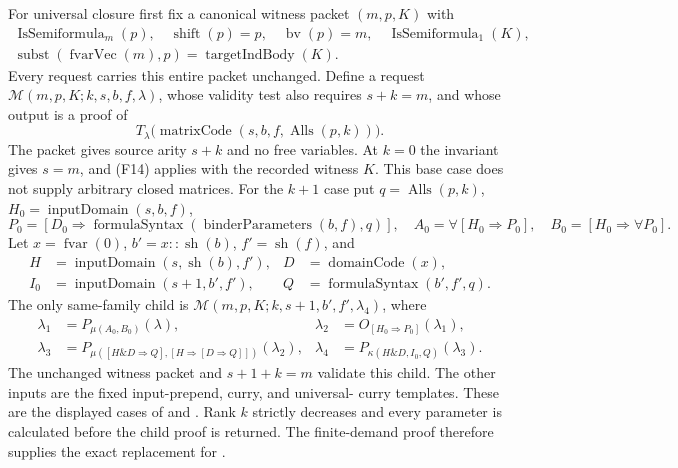 For universal closure first fix a canonical witness packet
$(m,p,K)$ with
\begin{gather*}
 \operatorname{IsSemiformula}_m(p),\quad
 \operatorname{shift}(p)=p,\quad \operatorname{bv}(p)=m,\quad
 \operatorname{IsSemiformula}_1(K),\\
 \operatorname{subst}(\operatorname{fvarVec}(m),p)
        =\operatorname{targetIndBody}(K).
\end{gather*}
Every request carries this entire packet unchanged.  Define a
request $\mathcal M(m,p,K;k,s,b,f,\lambda)$, whose validity test
also requires $s+k=m$, and whose output is a proof of
\[
 T_\lambda\bigl(\operatorname{matrixCode}
                   (s,b,f,\operatorname{Alls}(p,k))\bigr).
\]
The packet gives source arity $s+k$ and no free variables.  At
$k=0$ the invariant gives $s=m$, and (F14) applies with the
recorded witness $K$.  This base case does not supply arbitrary
closed matrices.
For the $k+1$ case put $q=\operatorname{Alls}(p,k)$,
$H_0=\operatorname{inputDomain}(s,b,f)$,
\[
 P_0=[D_0\Rightarrow
       \operatorname{formulaSyntax}(\operatorname{binderParameters}(b,f),q)],
 \quad A_0=\forall[H_0\Rightarrow P_0],\quad
 B_0=[H_0\Rightarrow\forall P_0].
\]
Let $x=\operatorname{fvar}(0)$, $b'=x::\operatorname{sh}(b)$,
$f'=\operatorname{sh}(f)$, and
\begin{align*}
 H&=\operatorname{inputDomain}(s,\operatorname{sh}(b),f'),&
 D&=\operatorname{domainCode}(x),\\
 I_0&=\operatorname{inputDomain}(s+1,b',f'),&
 Q&=\operatorname{formulaSyntax}(b',f',q).
\end{align*}
The only same-family child is
$\mathcal M(m,p,K;k,s+1,b',f',\lambda_4)$, where
\begin{align*}
 \lambda_1&=P_{\mu(A_0,B_0)}(\lambda),&
 \lambda_2&=O_{[H_0\Rightarrow P_0]}(\lambda_1),\\
 \lambda_3&=P_{\mu([H\mathbin\&D\Rightarrow Q],
                         [H\Rightarrow[D\Rightarrow Q]])}(\lambda_2),&
 \lambda_4&=P_{\kappa(H\mathbin\&D,I_0,Q)}(\lambda_3).
 \tag{F15}
\end{align*}
The unchanged witness packet and $s+1+k=m$ validate this child.
The other inputs are the fixed input-prepend, curry, and universal-
curry templates.  These are the displayed cases of
 and
.  Rank $k$ strictly decreases
and every parameter is calculated before the child proof is returned.
The finite-demand proof therefore supplies the exact replacement
for .

